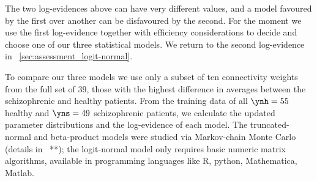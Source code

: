 The two log-evidences above can have very different values, and a model
favoured by the first over another can be disfavoured by the second. For
the moment we use the first log-evidence together with efficiency
considerations to decide and choose one of our three statistical models. We
return to the second log-evidence in
\sect~\ref{sec:assessment_logit-normal}.




To compare our three models we use only a subset of ten connectivity weights
from the full set of $39$, those with the highest difference in averages
between the schizophrenic and healthy patients.
From the training data of
all $\ynh=55$ healthy and $\yns=49$ schizophrenic patients, we calculate
the updated parameter distributions and the log-evidence of each model. The
truncated-normal and beta-product models were studied via Markov-chain
Monte Carlo (details in \sect~**); the 
logit-normal model only requires
basic numeric matrix algorithms, available in programming languages like R,
python, Mathematica, Matlab.


